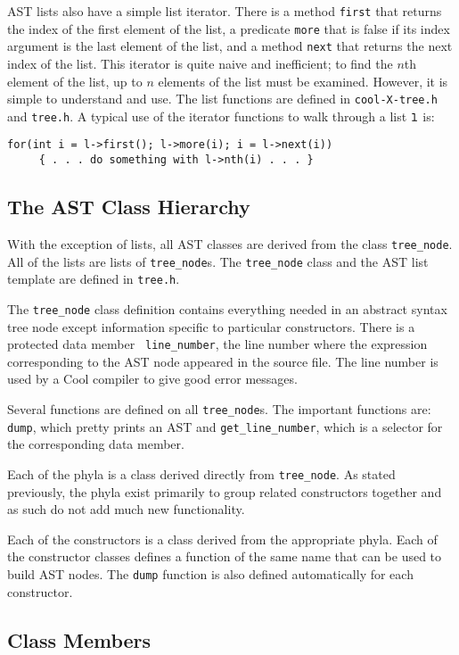 AST lists also have a simple list iterator.  There is a method {\tt first}
that returns the index of the first element of the list, a predicate {\tt more}
that is false if its index argument is the last element of the list, and
a method {\tt next} that returns the next index of the list.  This iterator
is quite naive and inefficient; to find the $n$th element of the list,
up to $n$ elements of the list must be examined.  However, it is simple
to understand and use.
The list functions are defined in {\tt cool-X-tree.h} and {\tt tree.h}.
A typical use of the iterator functions to walk through a list $\tt l$ is:
\begin{verbatim}
for(int i = l->first(); l->more(i); i = l->next(i))
     { . . . do something with l->nth(i) . . . }
\end{verbatim}

\subsection{The AST Class Hierarchy}

With the exception of lists, all AST classes are derived from the
class {\tt tree\_node}.  All of the lists are lists of {\tt tree\_node}s.
The {\tt tree\_node} class and the AST list template are defined in 
{\tt tree.h}.

The {\tt tree\_node} class definition contains everything needed in an
abstract syntax tree node except information specific to particular
constructors.  There is a protected data member {\tt
line\_number}, the line number where the expression corresponding to
the AST node appeared in the source file.
 The line number is used by a Cool compiler to give good
error messages.  

Several functions are defined on all {\tt tree\_node}s.  The important functions
are: {\tt dump}, which pretty prints an AST and {\tt get\_line\_number},
which is a selector for the corresponding data member.

Each of the phyla is a class derived directly from {\tt tree\_node}.  As stated
previously, the phyla exist primarily to group related constructors together
and as such do not add much new functionality.

Each of the constructors is a class derived from the appropriate
phyla.  Each of the constructor classes defines a function of the same
name that can be used to build AST nodes.  The {\tt dump} function is
also defined automatically for each constructor.

\subsection{Class Members}
\label{sec-sel}

